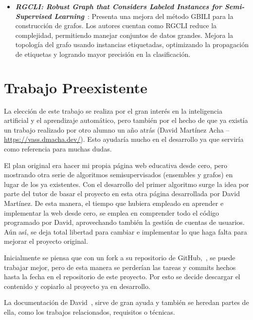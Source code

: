 \begin{itemize}
	\item \textbf{\textit{RGCLI: Robust Graph that Considers Labeled Instances for Semi-Supervised Learning}}~\cite{rgcli}: Presenta una mejora del método GBILI para la construcción de grafos. Los autores cuentan como RGCLI reduce la complejidad, permitiendo manejar conjuntos de datos grandes. Mejora la topología del grafo usando instancias etiquetadas, optimizando la propagación de etiquetas y logrando mayor precisión en la clasificación.
\end{itemize}
\section{Trabajo Preexistente}
La elección de este trabajo se realiza por el gran interés en la inteligencia artificial y el aprendizaje automático, pero también por el hecho de que ya existía un trabajo realizado por otro alumno un año atrás (David Martínez Acha -- \url{https://vass.dmacha.dev/}). Esto ayudaría mucho en el desarrollo ya que serviría como referencia para muchas dudas.

El plan original era hacer mi propia página web educativa desde cero, pero mostrando otra serie de algoritmos semisupervisados (ensembles y grafos) en lugar de los ya existentes. Con el desarrollo del primer algoritmo surge la idea por parte del tutor de basar el proyecto en esta otra página desarrollada por David Martínez. De esta manera, el tiempo que hubiera empleado en aprender e implementar la web desde cero, se emplea en comprender todo el código programado por David, aprovechando también la gestión de cuentas de usuarios. Aún así, se deja total libertad para cambiar e implementar lo que haga falta para mejorar el proyecto original.

Inicialmente se piensa que con un fork a su repositorio de GitHub,~\cite{GH:VASS}, se puede trabajar mejor, pero de esta manera se perderían las tareas y commits hechos hasta la fecha en el repositorio de este proyecto. Por esto se decide descargar el contenido y copiarlo al proyecto ya en desarrollo.

La documentación de David~\cite{TFG:David}, sirve de gran ayuda y también se heredan partes de ella, como los trabajos relacionados, requisitos o técnicas. 

